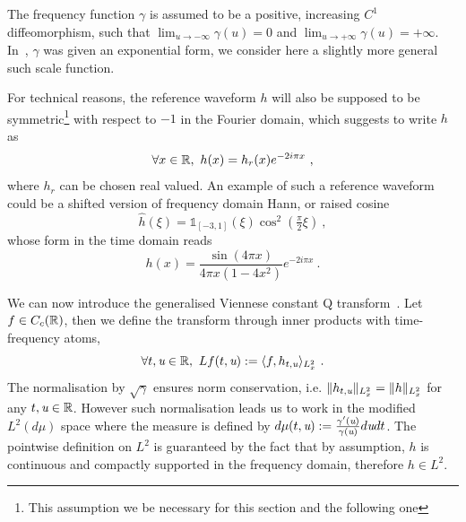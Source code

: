 The frequency function $\gamma$ is assumed to be a positive, increasing $C^1$ diffeomorphism, such that $\lim_{u\to -\infty}\gamma(u)=0$ and $\lim_{u\to +\infty}\gamma(u)=+\infty$. In~\cite{holighaus2012framework,velasco2011constructing}, $\gamma$ was given an exponential form, we consider here a slightly more general such scale function.

For technical reasons, the reference waveform $h$ will also be supposed to be symmetric\footnote{This assumption we be necessary for this section and the following one} with respect to $-1$ in the Fourier domain, which suggests to write $h$ as
\begin{equation}
\label{fo:hr}
    \forall x\in\mathbb{R}, \ h(x)= h_r(x)e^{-2i\pi x}\ ,
\end{equation}
where $h_r$ can be chosen real valued. 
An example of such a reference waveform could be a shifted version of frequency domain Hann, or raised cosine
\begin{equation}
	\hat{h}(\xi) = \mathds{1}_{[-3,1]}(\xi)\cos^2(\tfrac{\pi}{2} \xi)\ ,
\end{equation}
whose form in the time domain reads
\begin{equation}
	h(x) = \frac{\sin(4\pi x)}{4\pi x(1-4x^2)}e^{-2i\pi x}\ .
\end{equation}

We can now introduce the generalised Viennese constant Q transform~\cite{velasco2011constructing}. Let $f\in C_c(\mathbb{R})$, then we define the transform through inner products with time-frequency atoms,
\begin{equation}
    \forall t,\textit{u}\in\mathbb{R}, \ Lf(t,\textit{u}) := \langle f , h_{t,\textit{u}} \rangle_{L^2_x}\ .
\end{equation}
The normalisation by $\sqrt{\gamma}$ ensures norm conservation, i.e. $\|h_{t,\textit{u}}\|_{L^2_x}=\|h\|_{L^2_x}$ for any $t,\textit{u}\in\mathbb{R}$. However such normalisation leads us to work in the modified $L^2(d\mu)$ space where the measure is defined by $d\mu(t,\textit{u}) := \tfrac{\gamma'(\textit{u})}{\gamma(\textit{u})}d\textit{u} dt$. The pointwise definition on $L^2$ is guaranteed by the fact that by assumption, $h$ is continuous and compactly supported in the frequency domain, therefore $h\in L^2$.



